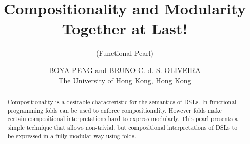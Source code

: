 \documentclass{jfp1}
\begin{document}
\setlength{\pdfpageheight}{\paperheight}
\setlength{\pdfpagewidth}{\paperwidth}






\title{Compositionality and Modularity Together at Last!}
\subtitle{(Functional Pearl)}

\author[B. Peng and B. C. d. S. Oliveira]
        {BOYA PENG and BRUNO C. d. S. OLIVEIRA\\
         The University of Hong Kong, Hong Kong\\
         }


\maketitle

\begin{abstract}
Compositionality is a desirable characteristic for the semantics of
DSLs. In functional programming folds can be used to enforce
compositionality. However folds make certain compositional
interpretations hard to express modularly. This pearl presents a
simple technique that allows non-trivial, but compositional
interpretations of DSLs to be expressed in a fully modular way
using folds.
\end{abstract}



\end{document}

